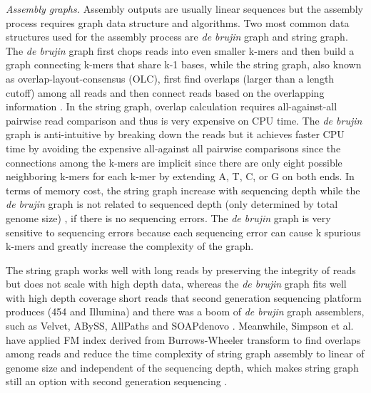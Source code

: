 \documentclass[]{msu-thesis}
\begin{document}
\textit{Assembly graphs. }
Assembly outputs are usually linear sequences but the assembly process requires graph data structure and algorithms. Two most common data structures used for the assembly process are \textit{de brujin} graph and string graph. 
The \textit{de brujin} graph first chops reads into even smaller k-mers and then build a graph connecting k-mers that share k-1 bases, while the string graph, also known as overlap-layout-consensus (OLC), first find overlaps (larger than a length cutoff) among all reads and then connect reads based on the overlapping information \cite{zerbino_velvet:_2008,simpson_efficient_2012}. In the string graph, overlap calculation requires all-against-all pairwise read comparison and thus is very expensive on CPU time. The \textit{de brujin} graph is anti-intuitive by breaking down the reads but it achieves faster CPU time by avoiding the expensive all-against all pairwise comparisons since the connections among the k-mers are implicit since there are only eight possible neighboring k-mers for each k-mer by extending A, T, C, or G on both ends. In terms of memory cost, the string graph increase with sequencing depth while the \textit{de brujin} graph is not related to sequenced depth (only determined by total genome size) \cite{li_comparison_2012}, if there is no sequencing errors. The \textit{de brujin} graph is very sensitive to sequencing errors because each sequencing error can cause k spurious k-mers and greatly increase the complexity of the graph.

The string graph works well with long reads by preserving the integrity of reads but does not scale with high depth data, whereas the \textit{de brujin} graph fits well with high depth coverage short reads that second generation sequencing platform produces (454 and Illumina) and there was a boom of \textit{de brujin} graph assemblers, such as Velvet, ABySS, AllPaths and SOAPdenovo \cite{zerbino_velvet:_2008,simpson_abyss:_2009,butler_allpaths:_2008,luo_soapdenovo2:_2012}. Meanwhile, Simpson et al. have applied FM index derived from Burrows-Wheeler transform to find overlaps among reads and reduce the time complexity of string graph assembly to linear of genome size and independent of the sequencing depth, which makes string graph still an option with second generation sequencing \cite{simpson_efficient_2012}.
\end{document}
